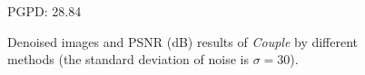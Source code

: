 \begin{figure}[ht!]
{\begin{minipage}[t]{0.24\textwidth}
{\footnotesize PGPD: 28.84}
\end{minipage}
}\vspace{-3mm}
    \caption{Denoised images and PSNR (dB) results of \textsl{Couple} by different methods (the standard deviation of noise is $\sigma=30$).}
    \label{fig2-10}
\end{figure}

\begin{figure}[t!]
    \centering
{}
\end{figure}
